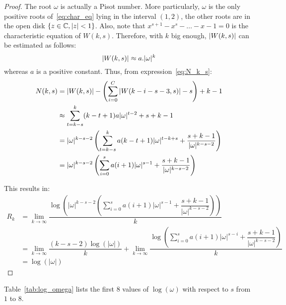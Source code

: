 \begin{proof}
    
    The root $\omega$ is actually a Pisot number. More particularly, $\omega$ is the only positive roots of~\ref{eq:char_eq} lying in the interval $(1,2)$, the other roots are in the open disk $\left\{z\in\mathbb{C},\left \lvert z \right \rvert<1\right\}$. Also, note that $x^{s+1}-x^{s}-\ldots-x-1=0$ is the characteristic equation of $W(k,s)$. Therefore, with $k$ big enough, $\left \lvert W(k,s) \right \rvert$ can be estimated as follows: \[\left \lvert W(k,s) \right \rvert \approx a.\lvert\omega\rvert^{k}\] whereas $a$ is a positive constant. Thus, from expression~\ref{eq:N_k_s}:
    \begin{align*}
        N(k,s) &= \left \lvert  W(k,s) \right \rvert - \left(\sum_{i=0}^{C}\left \lvert  W(k-i-s-3,s) \right \rvert - s\right) + k - 1 \\
        &\approx \sum_{t=k-s}^{k}(k-t+1)a\lvert\omega\rvert^{t-2} + s + k - 1\\
        &= \lvert\omega\rvert^{k-s-2}\left( \sum_{t=k-s}^{k}a(k-t+1)\lvert\omega\rvert^{t-k+s} + \dfrac{s+k-1}{\lvert\omega\rvert^{k-s-2}}\right)\\
        &= \lvert\omega\rvert^{k-s-2}\left( \sum_{i=0}^{s}a(i+1)\lvert\omega\rvert^{s-1} + \dfrac{s+k-1}{\lvert\omega\rvert^{k-s-2}}\right) 
    \end{align*}

    This results in:
    \begin{align*}
        R_{k} &= \lim_{k\to\infty}\dfrac{\log\left( \lvert\omega\rvert^{k-s-2}\left(\sum_{i=0}^{s}a(i+1)\lvert\omega\rvert^{s-1}+\dfrac{s+k-1}{\lvert\omega\rvert^{k-s-2}}\right)\right)}{k} \\
        &= \lim_{k\to\infty}\dfrac{(k-s-2)\log(\lvert\omega\rvert)}{k} + \lim_{k\to\infty}\dfrac{\log\left(\sum_{i=0}^{s}a(i+1)\lvert\omega\rvert^{s-i}+\dfrac{s+k-1}{\lvert\omega\rvert^{k-s-2}}\right)}{k}\\
        &= \log(\lvert\omega\rvert)
    \end{align*}
    
\end{proof}

Table~\ref{tab:log_omega} lists the first $8$ values of $\log(\omega)$ with respect to $s$ from $1$ to $8$. 


